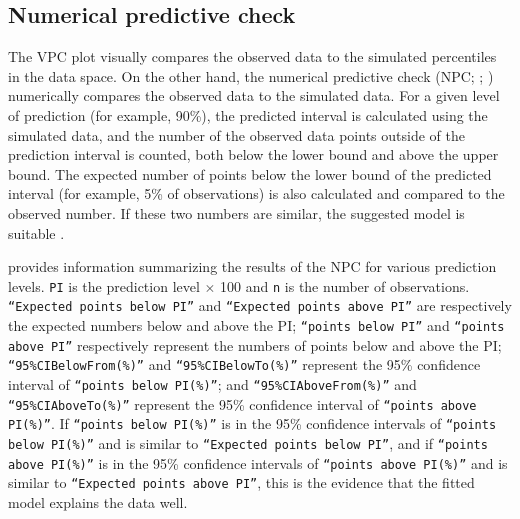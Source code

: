 \hypertarget{NPC}{%
\subsection{Numerical predictive check}\label{NPC}}

The VPC plot visually compares the observed data to the simulated percentiles in the data space. On the other hand, the numerical predictive check (NPC; \citealp*{wang2012standardized}; \citealp*{karlsson2007diagnosing})
numerically compares the observed data to the simulated data. For a given level of prediction (for example, 90\%), the predicted interval is calculated using the simulated data, and the number of the observed data points outside of the prediction interval is counted, both below the lower bound and above the upper bound. The expected number of points below the lower bound of the predicted interval (for example, 5\% of observations) is also calculated and compared to the observed number. If these two numbers are similar, the suggested model is suitable \citep{maharaj2019pitfalls}.

 provides information summarizing the results of the NPC for various prediction levels.
 {\tt PI} is the prediction level $\times$ 100 and {\tt n} is the number of observations.
 {\tt ``Expected points below PI''} and {\tt ``Expected points above PI''} are respectively the expected numbers below and above the PI; {\tt ``points below PI''} and {\tt ``points above PI''} respectively represent the numbers of points below and above the PI;
 {\tt ``95\%CIBelowFrom(\%)''} and {\tt ``95\%CIBelowTo(\%)''} represent the 95\% confidence interval of {\tt ``points below PI(\%)''}; and {\tt ``95\%CIAboveFrom(\%)''} and {\tt ``95\%CIAboveTo(\%)''} represent the 95\% confidence interval of {\tt ``points above PI(\%)''}. If {\tt ``points below PI(\%)''} is in the
95\% confidence intervals of {\tt ``points below PI(\%)''} and is similar to {\tt ``Expected points below PI''}, and if
  {\tt ``points above PI(\%)''} is in the
95\% confidence intervals of {\tt ``points above PI(\%)''} and is similar to {\tt ``Expected points above PI''}, this is the evidence that the fitted model explains the data well.


